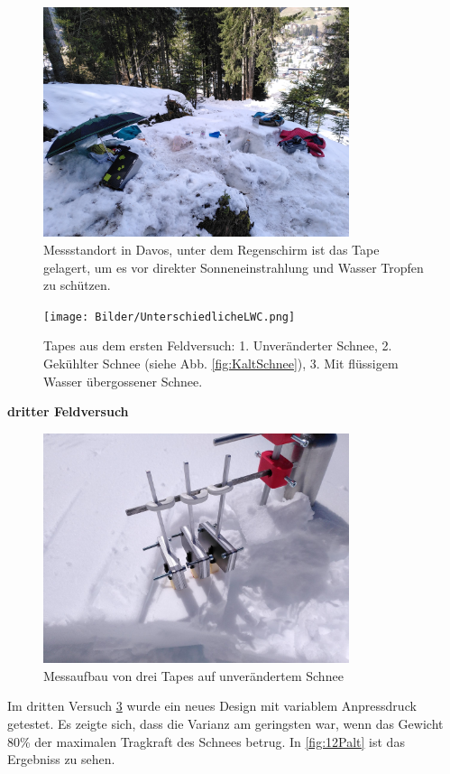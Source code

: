 \begin{figure}[H]
    \centering
    \includegraphics[width=0.8\textwidth]{Bilder/IMG_20240411_124421.jpg}
    \caption{Messstandort in Davos, unter dem Regenschirm ist das Tape gelagert, um es vor direkter Sonneneinstrahlung und Wasser Tropfen zu schützen.} 
    \label{fig:DavosMessung}
\end{figure}

\begin{figure}[H]
    \centering
    \texttt{[image: Bilder/UnterschiedlicheLWC.png]}
    \caption{Tapes aus dem ersten Feldversuch: 1. Unveränderter Schnee, 2. Gekühlter Schnee (siehe Abb. \ref{fig:KaltSchnee}),  3. Mit flüssigem Wasser übergossener Schnee.} 
    \label{fig:DavosMessung}
\end{figure}


\newpage

\textbf{dritter Feldversuch}
\label{drittFeldVer}

\begin{figure}[H]
    \centering
    \includegraphics[width=0.8\textwidth]{Bilder/aufbauTitlis.jpeg}
    \caption{Messaufbau von drei Tapes auf unverändertem Schnee} 
    \label{fig:aufbauTitlis}
\end{figure}
Im dritten Versuch \ref{fig:aufbauTitlis} wurde ein neues Design mit variablem Anpressdruck getestet. Es zeigte sich, dass die Varianz am geringsten war, wenn das Gewicht 80\% der maximalen Tragkraft des Schnees betrug. In \ref{fig:12Palt} ist das Ergebniss zu sehen.

